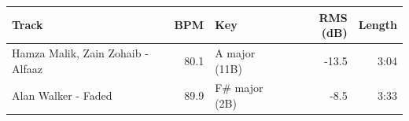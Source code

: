 \begin{tabularx}{\linewidth}{@{}Xrlrr@{}}\toprule
Track & BPM & Key & RMS (dB) & Length \\\midrule
Hamza Malik, Zain Zohaib - Alfaaz & 80.1 & A major (11B) & -13.5 & 3:04 \\
Alan Walker - Faded & 89.9 & F\# major (2B) & -8.5 & 3:33 \\
\bottomrule\end{tabularx}
